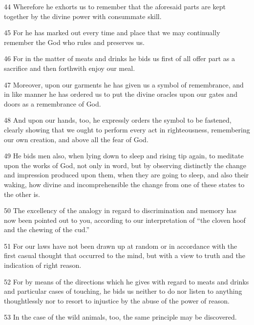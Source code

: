 \par 44 Wherefore he exhorts us to remember that the aforesaid parts are kept together by the divine power with consummate skill.

\par 45 For he has marked out every time and place that we may continually remember the God who rules and preserves us.

\par 46 For in the matter of meats and drinks he bids us first of all offer part as a sacrifice and then forthwith enjoy our meal.

\par 47 Moreover, upon our garments he has given us a symbol of remembrance, and in like manner he has ordered us to put the divine oracles upon our gates and doors as a remembrance of God.

\par 48 And upon our hands, too, he expressly orders the symbol to be fastened, clearly showing that we ought to perform every act in righteousness, remembering our own creation, and above all the fear of God.

\par 49 He bids men also, when lying down to sleep and rising tip again, to meditate upon the works of God, not only in word, but by observing distinctly the change and impression produced upon them, when they are going to sleep, and also their waking, how divine and incomprehensible the change from one of these states to the other is.

\par 50 The excellency of the analogy in regard to discrimination and memory has now been pointed out to you, according to our interpretation of “the cloven hoof and the chewing of the cud.”

\par 51 For our laws have not been drawn up at random or in accordance with the first casual thought that occurred to the mind, but with a view to truth and the indication of right reason.

\par 52 For by means of the directions which he gives with regard to meats and drinks and particular cases of touching, he bids us neither to do nor listen to anything thoughtlessly nor to resort to injustice by the abuse of the power of reason.

\par 53 In the case of the wild animals, too, the same principle may be discovered.

